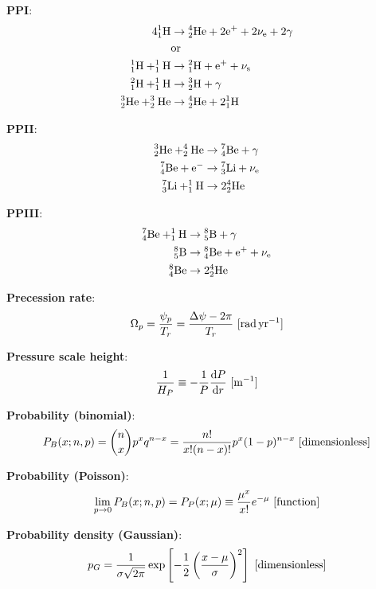 \documentclass[a4paper,10pt]{article}
\begin{document}
{\noindent}\textbf{PPI}:
\begin{align*}
    {\rm 4^1_1H} &\rightarrow {\rm ^4_2He + 2e^+ + 2\nu_e + 2\gamma} \\
    &{\rm or} \\
    {\rm ^1_1H + ^1_1H} &\rightarrow {\rm ^2_1H + e^+ + \nu_s} \\
    {\rm ^2_1H + ^1_1H} &\rightarrow {\rm ^3_2H + \gamma} \\
    {\rm ^3_2He + ^3_2He} &\rightarrow {\rm ^4_2He + 2^1_1H}
\end{align*}

{\noindent}\textbf{PPII}:
\begin{align*}
    {\rm ^3_2He + ^4_2He} &\rightarrow {\rm ^7_4Be + \gamma} \\
    {\rm ^7_4Be + e^-} &\rightarrow {\rm ^7_3Li + \nu_e} \\
    {\rm ^7_3Li + ^1_1H} &\rightarrow {\rm 2^4_2He}
\end{align*}

{\noindent}\textbf{PPIII}:
\begin{align*}
    {\rm ^7_4Be + ^1_1H} &\rightarrow {\rm ^8_5B + \gamma} \\
    {\rm ^8_5B} &\rightarrow {\rm ^8_4Be + e^+ + \nu_e} \\
    {\rm ^8_4Be} &\rightarrow {\rm 2^4_2He}
\end{align*}

{\noindent}\textbf{Precession rate}:
\begin{align*}
    \Omega_p = \frac{\psi_p}{T_r} = \frac{\Delta\psi-2\pi}{T_r} ~ [{\rm rad\,yr^{-1}}]
\end{align*}

{\noindent}\textbf{Pressure scale height}:
\begin{align*}
    \frac{1}{H_P} \equiv -\frac{1}{P}\frac{{\rm d}P}{{\rm d}r} ~ [{\rm m^{-1}}]
\end{align*}

{\noindent}\textbf{Probability (binomial)}:
\begin{align*}
    P_B(x;n,p) = \binom{n}{x}p^xq^{n-x} = \frac{n!}{x!(n-x)!}p^x(1-p)^{n-x} ~ [{\rm dimensionless}]
\end{align*}

{\noindent}\textbf{Probability (Poisson)}:
\begin{align*}
    \lim_{p\rightarrow0}P_B(x;n,p) = P_P(x;\mu) \equiv \frac{\mu^x}{x!}e^{-\mu} ~ [{\rm function}]
\end{align*}

{\noindent}\textbf{Probability density (Gaussian)}:
\begin{align*}
    p_G = \frac{1}{\sigma\sqrt{2\pi}}\exp \left[-\frac{1}{2} \left(\frac{x-\mu}{\sigma}\right)^2 \right] ~ [{\rm dimensionless}]
\end{align*}
\end{document}

